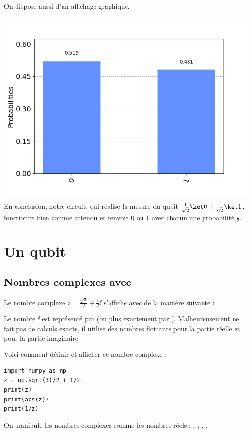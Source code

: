 \documentclass[11pt,class=report,crop=false]{standalone}
\begin{document}
On dispose aussi d'un affichage graphique.
\begin{center}
\includegraphics[scale=\myscale,scale=0.5]{figures/fig-qiskit-01}
\end{center}

En conclusion, notre circuit, qui réalise la mesure du qubit $\frac1{\sqrt2}\ket0 + \frac1{\sqrt2}\ket1$, fonctionne bien comme attendu et renvoie $0$ ou $1$ avec chacun une probabilité $\frac12$.


\section{Un qubit}


\subsection{Nombres complexes avec \Python}

Le nombre complexe $z =\frac{\sqrt3}{2} + \frac12\ii$ s'affiche avec \Python{} de la manière suivante :

Le nombre $\ii$ est représenté par  (ou plus exactement par ). Malheureusement \Python{} ne fait pas de calculs exacts, il utilise des nombres flottants pour la partie réelle et pour la partie imaginaire.

Voici comment définir et afficher ce nombre complexe :
\begin{lstlisting}
import numpy as np
z = np.sqrt(3)/2 + 1/2j
print(z)
print(abs(z))
print(1/z)
\end{lstlisting}
On manipule les nombres complexes comme les nombres réels : ,
, , .
\end{document}
